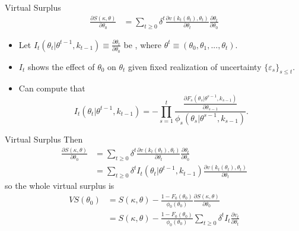 \documentclass[english,10pt
,aspectratio=169
]{beamer}
\begin{document}
\begin{frame}{Virtual Surplus}
\begin{align*}
	\frac{\partial S(\kappa,\theta)}{\partial \theta_0} &= \sum_{t\geq 0} \delta^t \frac{\partial v(k_t(\theta_t),\theta_t)}{\partial \theta_t} \frac{\partial \theta_t}{\partial \theta_0}
\end{align*}
\begin{itemize}
	\item Let $I_t(\theta_t | \theta^{t-1}, k_{t-1}) \equiv \frac{\partial \theta_t}{\partial \theta_0}$ be , where $\theta^t \equiv (\theta_0, \theta_1,...,\theta_t)$.
	\item $I_t$ shows the effect of $\theta_0$ on $\theta_t$ given fixed realization of uncertainty $\{\varepsilon_s\}_{s\leq t}$.
	\item Can compute that $$I_t(\theta_t | \theta^{t-1}, k_{t-1}) = -\prod_{s=1}^t \frac{\frac{\partial F_s(\theta_s | \theta^{s-1}, k_{s-1})}{\partial \theta_{s-1}}}{\phi_s(\theta_s | \theta^{s-1}, k_{s-1})}.$$
\end{itemize}
\end{frame}


\begin{frame}{Virtual Surplus}
Then
\begin{align*}
	\frac{\partial S(\kappa,\theta)}{\partial \theta_0} &= \sum_{t\geq 0} \delta^t \frac{\partial v(k_t(\theta_t),\theta_t)}{\partial \theta_t} \frac{\partial \theta_t}{\partial \theta_0}
	\\
	&= \sum_{t\geq 0} \delta^t I_t(\theta_t | \theta^{t-1}, k_{t-1}) \frac{\partial v(k_t(\theta_t),\theta_t)}{\partial \theta_t}
\end{align*}
so the whole virtual surplus is
\begin{align*}
	VS(\theta_0) &= S(\kappa,\theta) - \frac{1-F_0(\theta_0)}{\phi_0(\theta_0)} \frac{\partial S(\kappa,\theta)}{\partial \theta_0}
	\\
	&= S(\kappa,\theta) - \frac{1-F_0(\theta_0)}{\phi_0(\theta_0)} \sum_{t\geq 0} \delta^t I_t \frac{\partial v_t}{\partial \theta_t}
\end{align*}
\end{frame}
\end{document}
